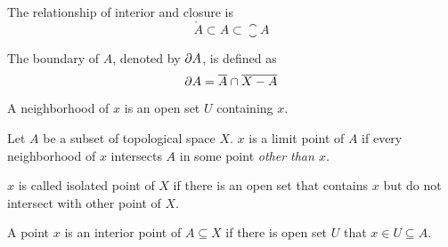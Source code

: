 \begin{theorem}
    The relationship of interior and closure is
\begin{equation}
    \mathring{A} \subset A \subset \closure{A}
\end{equation}
\end{theorem}



\begin{definition}
    The boundary of $A$, denoted by $\partial A$, is defined as
    \begin{equation}
        \partial A = \overline{A} \cap \overline{X - A}
    \end{equation}
\end{definition}


\begin{definition}
    A neighborhood of $x$ is an open set $U$ containing $x$.
\end{definition}


\begin{definition}
    Let $A$ be a subset of topological space $X$. $x$ is a limit point of $A$ if every neighborhood of $x$ intersects $A$ in some point \emph{other than $x$}.
\end{definition}

\begin{definition}
    $x$ is called isolated point of $X$ if there is an open set that contains $x$ but do not intersect with other point of $X$.
\end{definition}

\begin{definition}
    A point $x$ is an interior point of $A \subseteq X$ if there is open set $U$ that $x \in U \subseteq A$.
\end{definition}


